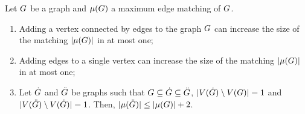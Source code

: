 \documentclass[msc,english,table,xcdraw]{ppgccufmg}
\begin{document}
\begin{lemma}
\label{lem:matching_inc_one}
Let $G$ be a graph and $\mu(G)$ a maximum edge matching of $G$.
\begin{enumerate}
    \item Adding a vertex connected by edges to the graph $G$ can increase the size of the matching $|\mu(G)|$ in at most one; %
    \item Adding edges to a single vertex can increase the size of the matching 
$|\mu(G)|$ in at most one; %
    \item Let $\dot{G}$ and $\ddot{G}$ be graphs such that $G \subseteq \dot{G}
    \subseteq \ddot{G}$, $|V(\dot{G}) \setminus V(G)| = 1$
    and $|V(\ddot{G}) \setminus V(\dot{G}) | = 1$.
    Then, $|\mu(\ddot{G})| \leq |\mu(G)| + 2$.
\end{enumerate}
\end{lemma}
\end{document}
